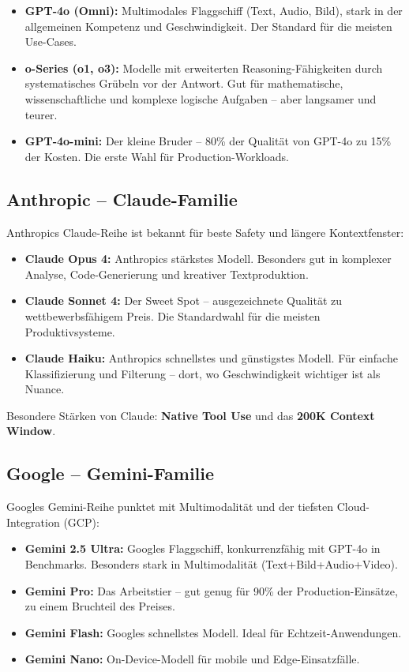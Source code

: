 \begin{itemize}[leftmargin=*]
    \item \textbf{GPT-4o (Omni):} Multimodales Flaggschiff (Text, Audio, Bild), stark in der allgemeinen Kompetenz und Geschwindigkeit. Der Standard für die meisten Use-Cases.
    \item \textbf{o-Series (o1, o3):} Modelle mit erweiterten Reasoning-Fähigkeiten durch systematisches Grübeln vor der Antwort. Gut für mathematische, wissenschaftliche und komplexe logische Aufgaben -- aber langsamer und teurer.
    \item \textbf{GPT-4o-mini:} Der kleine Bruder -- 80\% der Qualität von GPT-4o zu 15\% der Kosten. Die erste Wahl für Production-Workloads.
\end{itemize}

\subsection{Anthropic -- Claude-Familie}

Anthropics Claude-Reihe ist bekannt für beste Safety und längere Kontextfenster:

\begin{itemize}[leftmargin=*]
    \item \textbf{Claude Opus 4:} Anthropics stärkstes Modell. Besonders gut in komplexer Analyse, Code-Generierung und kreativer Textproduktion.
    \item \textbf{Claude Sonnet 4:} Der Sweet Spot -- ausgezeichnete Qualität zu wettbewerbsfähigem Preis. Die Standardwahl für die meisten Produktivsysteme.
    \item \textbf{Claude Haiku:} Anthropics schnellstes und günstigstes Modell. Für einfache Klassifizierung und Filterung -- dort, wo Geschwindigkeit wichtiger ist als Nuance.
\end{itemize}

Besondere Stärken von Claude: \textbf{Native Tool Use} und das \textbf{200K Context Window}.

\subsection{Google -- Gemini-Familie}

Googles Gemini-Reihe punktet mit Multimodalität und der tiefsten Cloud-Integration (GCP):

\begin{itemize}[leftmargin=*]
    \item \textbf{Gemini 2.5 Ultra:} Googles Flaggschiff, konkurrenzfähig mit GPT-4o in Benchmarks. Besonders stark in Multimodalität (Text+Bild+Audio+Video).
    \item \textbf{Gemini Pro:} Das Arbeitstier -- gut genug für 90\% der Production-Einsätze, zu einem Bruchteil des Preises.
    \item \textbf{Gemini Flash:} Googles schnellstes Modell. Ideal für Echtzeit-Anwendungen.
    \item \textbf{Gemini Nano:} On-Device-Modell für mobile und Edge-Einsatzfälle.
\end{itemize}

